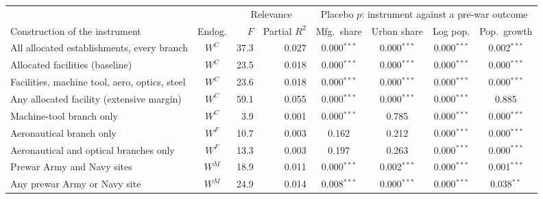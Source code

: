 \begin{tabular}{lcrrcccc}
\toprule
& & \multicolumn{2}{c}{Relevance} & \multicolumn{4}{c}{Placebo $p$: instrument against a pre-war outcome} \\
\cmidrule(lr){3-4}\cmidrule(lr){5-8}
Construction of the instrument & Endog. & $F$ & Partial $R^2$ & Mfg.\ share & Urban share & Log pop. & Pop.\ growth \\
\midrule
All allocated establishments, every branch & $W^{C}$ & 37.3 & 0.027 & 0.000$^{***}$ & 0.000$^{***}$ & 0.000$^{***}$ & 0.002$^{***}$ \\
Allocated facilities (baseline) & $W^{C}$ & 23.5 & 0.018 & 0.000$^{***}$ & 0.000$^{***}$ & 0.000$^{***}$ & 0.000$^{***}$ \\
Facilities, machine tool, aero, optics, steel & $W^{C}$ & 23.6 & 0.018 & 0.000$^{***}$ & 0.000$^{***}$ & 0.000$^{***}$ & 0.000$^{***}$ \\
Any allocated facility (extensive margin) & $W^{C}$ & 59.1 & 0.055 & 0.000$^{***}$ & 0.000$^{***}$ & 0.000$^{***}$ & 0.885 \\
Machine-tool branch only & $W^{C}$ & 3.9 & 0.001 & 0.000$^{***}$ & 0.785 & 0.000$^{***}$ & 0.000$^{***}$ \\
Aeronautical branch only & $W^{F}$ & 10.7 & 0.003 & 0.162 & 0.212 & 0.000$^{***}$ & 0.000$^{***}$ \\
Aeronautical and optical branches only & $W^{F}$ & 13.3 & 0.003 & 0.197 & 0.263 & 0.000$^{***}$ & 0.000$^{***}$ \\
Prewar Army and Navy sites & $W^{M}$ & 18.9 & 0.011 & 0.000$^{***}$ & 0.002$^{***}$ & 0.000$^{***}$ & 0.001$^{***}$ \\
Any prewar Army or Navy site & $W^{M}$ & 24.9 & 0.014 & 0.008$^{***}$ & 0.000$^{***}$ & 0.000$^{***}$ & 0.038$^{**}$ \\
\bottomrule
\end{tabular}
